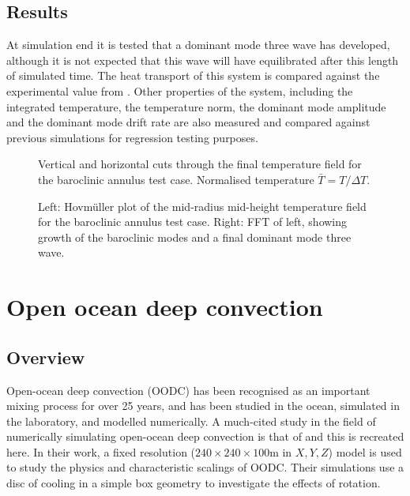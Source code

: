 \subsection{Results}

At simulation end it is tested that a dominant mode three wave has developed,
although it is not expected that this wave will have equilibrated after this
length of simulated time. The heat transport of this system is compared against
the experimental value from \citet{read2003}. Other properties of the system,
including the integrated temperature, the temperature \Ltwo norm, the dominant
mode amplitude and the dominant mode drift rate are also measured and compared
against previous simulations for regression testing purposes.

\begin{figure}[ht]
  \centering
  \caption{Vertical and horizontal cuts through the final temperature field
           for the baroclinic annulus test case. Normalised temperature
           $\bar{T} = T / \Delta T$.}
\end{figure}

\begin{figure}[ht]
  \centering
  \caption{Left: Hovm\"uller plot of the mid-radius mid-height temperature field
           for the baroclinic annulus test case. Right: FFT of left, showing
           growth of the baroclinic modes and a final dominant mode three wave.}
\end{figure}


\section{Open ocean deep convection}
\label{sect:OODC}
\subsection{Overview}
Open-ocean deep convection (OODC) has been recognised as an
important mixing process for over 25 years, and
has been studied in the ocean, simulated in the laboratory, and modelled numerically.
A much-cited study in the field of numerically simulating
open-ocean deep convection is that of \cite{jones1993} and this is recreated here.
In their work, a fixed resolution ($240 \times 240 \times
100$m in $X, Y, Z$) model is used to study the physics and
characteristic scalings of OODC. Their simulations use a disc
of cooling in a simple box geometry to investigate the effects of rotation.


